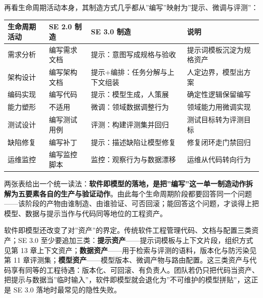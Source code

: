 \documentclass[12pt,a4paper,twoside,openany]{ctexbook}
\numberwithin{figure}{chapter}
\numberwithin{table}{chapter}
\newcounter{none}
\begin{document}
再看生命周期活动本身，其制造方式几乎都从''编写''映射为''提示、微调与评测''：

{\def\LTcaptype{none} %
\begin{longtable}[]{@{}
  >{\raggedright\arraybackslash}p{}
  >{\raggedright\arraybackslash}p{}
  >{\raggedright\arraybackslash}p{}
  >{\raggedright\arraybackslash}p{}@{}}
\toprule\noalign{}
\begin{minipage}[b]{\linewidth}\raggedright
生命周期活动
\end{minipage} & \begin{minipage}[b]{\linewidth}\raggedright
SE 2.0 制造
\end{minipage} & \begin{minipage}[b]{\linewidth}\raggedright
SE 3.0 制造
\end{minipage} & \begin{minipage}[b]{\linewidth}\raggedright
说明
\end{minipage} \\
\midrule\noalign{}
\endhead
\bottomrule\noalign{}
\endlastfoot
需求分析 & 编写需求文档 & 提示：意图写成规格与验收 &
提示词模板沉淀为规格资产 \\
架构设计 & 编写架构文档 & 提示+编排：任务分解与上下文组装 &
人定边界，模型出方案 \\
编码实现 & 编写代码 & 提示：模型生成，人策展 & 确定性逻辑保留编写 \\
能力塑形 & 不适用 & 微调：领域数据调整行为 & 领域能力用微调实现 \\
测试设计 & 编写测试用例 & 评测：构建评测集并回归 &
测试目标转为评测目标 \\
缺陷修复 & 编写补丁 & 提示：描述缺陷让模型修复 & 修复闭环走门禁回归 \\
运维监控 & 编写监控脚本 & 监控：观察行为与数据漂移 &
运维从代码转向行为 \\
\end{longtable}
}

两张表给出一个统一读法：\textbf{软件即模型的落地，是把''编写''这一单一制造动作拆解为五要素各自的生产与验证动作}。由此每个生命周期阶段都要回答同一个问题------该阶段的产物由谁制造、由谁验证、可否回滚；能回答这个问题，才谈得上把模型、数据与提示当作与代码同等地位的工程资产。

软件即模型还改变了对''资产''的界定。传统软件工程管理代码、文档与配置三类资产；SE
3.0
至少要追加三类：\textbf{提示资产}------提示词模板与上下文片段，组织方式见第
13
章上下文资产；\textbf{数据资产}------用于检索与评测的语料，版本化与防污染见第
11
章评测集；\textbf{模型资产}------模型版本、微调产物与路由配置。这三类资产与代码享有同等的工程待遇：版本化、可回滚、有负责人。团队若仍只把代码当资产、把提示与数据当''临时输入''，软件即模型就会退化为''不可维护的模型拼贴''，这正是
SE 3.0 落地时最常见的隐性失败。
\end{document}
